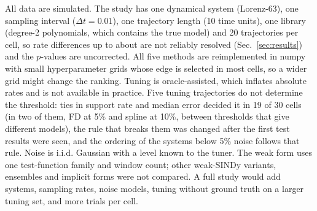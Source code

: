 All data are simulated. The study has one dynamical system (Lorenz-63), one sampling interval ($\Delta t=0.01$), one trajectory length (10 time units), one library (degree-2 polynomials, which contains the true model) and 20 trajectories per cell, so rate differences up to about  are not reliably resolved (Sec.~\ref{sec:results}) and the $p$-values are uncorrected. All five methods are reimplemented in numpy with small hyperparameter grids whose edge is selected in most cells, so a wider grid might change the ranking. Tuning is oracle-assisted, which inflates absolute rates and is not available in practice. Five tuning trajectories do not determine the threshold: ties in support rate and median error decided it in 19 of 30 cells (in two of them, FD at 5\% and spline at 10\%, between thresholds that give different models), the rule that breaks them was changed after the first test results were seen, and the ordering of the systems below 5\% noise follows that rule. Noise is i.i.d. Gaussian with a level known to the tuner. The weak form uses one test-function family and window count; other weak-SINDy variants, ensembles and implicit forms were not compared. A full study would add systems, sampling rates, noise models, tuning without ground truth on a larger tuning set, and more trials per cell.
